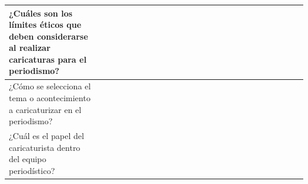 \documentclass[12pt,a4paper]{article}
\begin{document}
\begin{landscape}
\begin{table}[ht!]
\begin{tabular}{|l|l|l|l|l|l|l|l|l|l|l|l|l|l|l|l|l|l|l|l|l|l|l|l|l|l|}
			¿Cuáles son los límites éticos que deben considerarse al realizar caricaturas para el periodismo?      &                                          &    &    &    &    &    &    &    &    &     &     &     &     &     &     &     &     &     &     &     &           \\\hline
			¿Cómo se selecciona el tema o acontecimiento a caricaturizar en el periodismo?                         &                                          &    &    &    &    &    &    &    &    &     &     &     &     &     &     &     &     &     &     &     &           \\\hline
			¿Cuál es el papel del caricaturista dentro del equipo periodístico?                                    &                                          &    &    &    &    &    &    &    &    &     &     &     &     &     &     &     &     &     &     &     &           \\\hline
		\end{tabular}
	\end{table}
\end{landscape}
\end{document}
